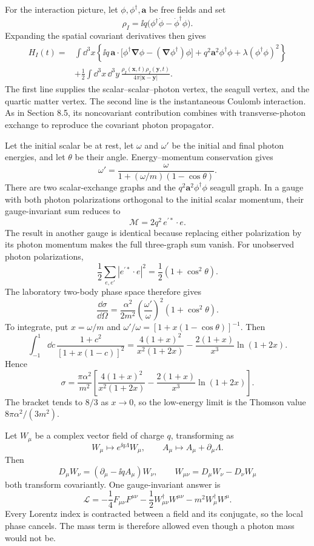 \begin{enumerate}
For the interaction picture, let \(\phi,\phi^\dagger,\mathbf a\) be free
fields and set
\[
 \rho_I=\ii q\bigl(\phi^\dagger\dot\phi-\dot\phi^\dagger\phi\bigr).
\]
Expanding the spatial covariant derivatives then gives
\[
 \begin{split}
 H_I(t)={}&\int \dd^3x\left\{
 \ii q\,\mathbf a\cdot
 \bigl[\phi^\dagger\boldsymbol\nabla\phi
 -(\boldsymbol\nabla\phi^\dagger)\phi\bigr]
 +q^2\mathbf a^2\phi^\dagger\phi
 +\lambda(\phi^\dagger\phi)^2\right\}\\
 &+\frac12\int \dd^3x\,\dd^3y\,
 \frac{\rho_I(\mathbf x,t)\rho_I(\mathbf y,t)}
 {4\pi|\mathbf x-\mathbf y|}.
 \end{split}
\]
The first line supplies the scalar--scalar--photon vertex, the seagull
vertex, and the quartic matter vertex.  The second line is the instantaneous
Coulomb interaction.  As in Section 8.5, its noncovariant contribution
combines with transverse-photon exchange to reproduce the covariant photon
propagator.

Let the initial scalar be at rest, let \(\omega\) and \(\omega'\) be the
initial and final photon energies, and let \(\theta\) be their angle.
Energy--momentum conservation gives
\[
 \omega'=\frac{\omega}
 {1+(\omega/m)(1-\cos\theta)}.
\]
There are two scalar-exchange graphs and the \(q^2\mathbf a^2\phi^\dagger
\phi\) seagull graph.  In a gauge with both photon polarizations orthogonal
to the initial scalar momentum, their gauge-invariant sum reduces to
\[
 \mathcal M=2q^2\,e^{\prime *}\cdot e .
\]
The result in another gauge is identical because replacing either
polarization by its photon momentum makes the full three-graph sum vanish.
For unobserved photon polarizations,
\[
 \frac12\sum_{e,e'}|e^{\prime *}\cdot e|^2
 =\frac12(1+\cos^2\theta).
\]
The laboratory two-body phase space therefore gives
\[
 \boxed{\;
 \frac{\dd\sigma}{\dd\Omega}
 =\frac{\alpha^2}{2m^2}
 \left(\frac{\omega'}{\omega}\right)^2
 (1+\cos^2\theta).\;}
\]
To integrate, put \(x=\omega/m\) and
\(\omega'/\omega=[1+x(1-\cos\theta)]^{-1}\).  Then
\[
 \int_{-1}^{1}\dd c\,
 \frac{1+c^2}{[1+x(1-c)]^2}
 =\frac{4(1+x)^2}{x^2(1+2x)}
 -\frac{2(1+x)}{x^3}\ln(1+2x).
\]
Hence
\[
 \boxed{\;
 \sigma=\frac{\pi\alpha^2}{m^2}
 \left[
 \frac{4(1+x)^2}{x^2(1+2x)}
 -\frac{2(1+x)}{x^3}\ln(1+2x)
 \right].\;}
\]
The bracket tends to \(8/3\) as \(x\to0\), so the low-energy limit is the
Thomson value \(8\pi\alpha^2/(3m^2)\).

Let \(W_\mu\) be a complex vector field of charge \(q\), transforming as
\[
 W_\mu\longmapsto e^{\ii q\Lambda}W_\mu,\qquad
 A_\mu\longmapsto A_\mu+\partial_\mu\Lambda .
\]
Then
\[
 D_\mu W_\nu=(\partial_\mu-\ii qA_\mu)W_\nu,\qquad
 W_{\mu\nu}=D_\mu W_\nu-D_\nu W_\mu
\]
both transform covariantly.  One gauge-invariant answer is
\[
 \boxed{\quad
 \mathcal L=
 -\frac14F_{\mu\nu}F^{\mu\nu}
 -\frac12W_{\mu\nu}^\dagger W^{\mu\nu}
 -m^2W_\mu^\dagger W^\mu .
 \quad}
\]
Every Lorentz index is contracted between a field and its conjugate, so the
local phase cancels.  The mass term is therefore allowed even though a
photon mass would not be.


\end{enumerate}
